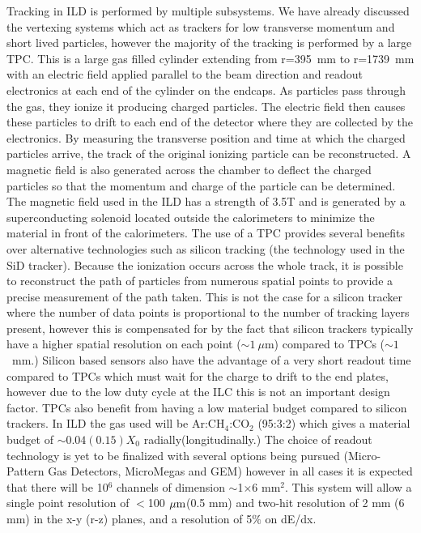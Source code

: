 Tracking in \ac{ILD} is performed by multiple subsystems. We have already discussed the vertexing systems which act as trackers for low transverse momentum and short lived particles, however the majority of the tracking is performed by a large \ac{TPC}.  This is a large gas filled cylinder extending from r=395~mm to r=1739~mm with an electric field applied parallel to the beam direction and readout electronics at each end of the cylinder on the endcaps. As particles pass through the gas, they ionize it producing charged particles. The electric field then causes these particles to drift to each end of the detector where they are collected by the electronics. By measuring the transverse position and time at which the charged particles arrive, the track of the original ionizing particle can be reconstructed. A magnetic field is also generated across the chamber to deflect the charged particles so that the momentum and charge of the particle can be determined. The magnetic field used in the ILD has a strength of 3.5T and is generated by a superconducting solenoid located outside the calorimeters to minimize the material in front of the calorimeters. The use of a \ac{TPC} provides several benefits over alternative technologies such as silicon tracking (the technology used in the \ac{SiD} tracker). Because the ionization occurs across the whole track, it is possible to reconstruct the path of particles from numerous spatial points to provide a precise measurement of the path taken. This is not the case for a silicon tracker where the number of data points is proportional to the number of tracking layers present, however this is compensated for by the fact that silicon trackers typically have a higher spatial resolution on each point ($\sim 1~\mu$m) compared to TPCs ($\sim 1$~mm.) Silicon based sensors also have the advantage of a very short readout time compared to TPCs which must wait for the charge to drift to the end plates, however due to the low duty cycle at the ILC this is not an important design factor. TPCs also benefit from having a low material budget compared to silicon trackers. In \ac{ILD} the gas used will be Ar:CH$_{4}$:CO$_{2}$ (95:3:2) which gives a material budget of $\sim 0.04(0.15)X_0$ radially(longitudinally.) The choice of readout technology is yet to be finalized with several options being pursued (Micro-Pattern Gas Detectors, MicroMegas\cite{Giomataris:1995fq} and GEM\cite{Sauli:1997qp}) however in all cases it is expected that there will be 10${^{6}}$ channels of dimension $\sim$1$\times$6 mm$^{2}$. This system will allow a single point resolution of $<$100$~\mu\textrm{m}$(0.5 mm) and two-hit resolution of 2 mm (6 mm)  in the x-y (r-z) planes, and a resolution of 5$\%$ on dE/dx.

